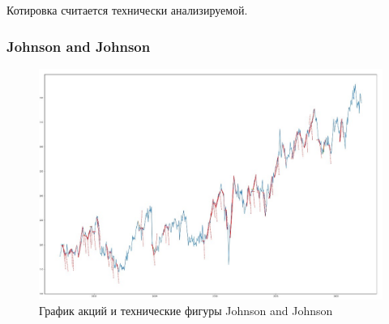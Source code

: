 \documentclass[bachelor, och, coursework]{SCWorks}
\begin{document}
    Котировка считается технически анализируемой.

    \subsubsection{Johnson and Johnson}
    
    \begin{figure}[H]
        \centering
        \includegraphics[width=\textwidth]{pic/JNJ.jpg}
        \caption{График акций и технические фигуры Johnson and Johnson}
    \end{figure}
    
    \pagebreak
\end{document}
